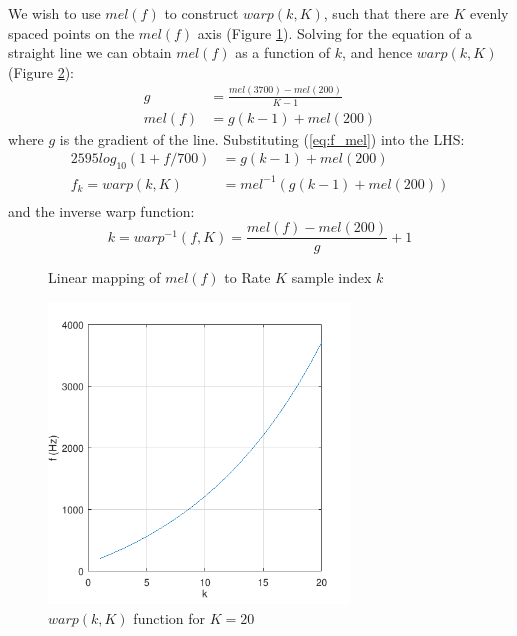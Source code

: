 \documentclass{article}
\begin{document}
{We wish to use $mel(f)$ to construct $warp(k,K)$, such that there are $K$ evenly spaced points on the $mel(f)$ axis (Figure \ref{fig:mel_k}).  Solving for the equation of a straight line we can obtain $mel(f)$ as a function of $k$, and hence $warp(k,K)$ (Figure \ref{fig:warp_fhz_k}):
\begin{equation}
\label{eq:mel_k}
\begin{split}
g &= \frac{mel(3700)-mel(200)}{K-1} \\
mel(f) &= g(k-1) + mel(200)
\end{split}
\end{equation}
where $g$ is the gradient of the line. Substituting (\ref{eq:f_mel}) into the LHS:
\begin{equation}
\label{eq:warp}
\begin{split}
2595log_{10}(1+f/700) &= g(k-1) + mel(200) \\
f_k = warp(k,K) &= mel^{-1} ( g(k-1) + mel(200) ) \\
\end{split}
\end{equation}
and the inverse warp function:
\begin{equation} \label{warp_inv}
k = warp^{-1}(f,K) = \frac{mel(f)-mel(200)}{g} + 1
\end{equation}

\begin{figure}[h]
\caption{Linear mapping of $mel(f)$ to Rate $K$ sample index $k$}
\vspace{5mm}
\label{fig:mel_k}
\centering
{}
\end{figure}

\begin{figure}[h]
\caption{$warp(k,K)$ function for $K=20$}
\label{fig:warp_fhz_k}
\begin{center}
\includegraphics[width=8cm]{warp_fhz_k}
\end{center}
\end{figure}

}
\end{document}
